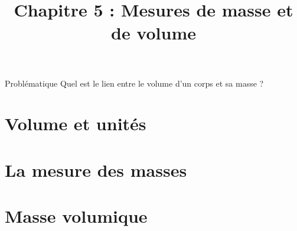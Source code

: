 \documentclass[xcolor={dvipsnames}]{beamer}
\title[Ch 5 : Mesures de masse et de volume]{Chapitre 5 : Mesures de masse et de volume}
\begin{document}
\begin{frame}
  \titlepage 
\end{frame}


\begin{frame}
\begin{block}{Problématique}
	{\Large Quel est le lien entre le volume d'un corps et sa masse ?}
\end{block}
\end{frame}


\section{Volume et unités}




\begin{frame}
	
\end{frame}



\section{La mesure des masses}

\begin{frame}
	
\end{frame}





\section{Masse volumique}

\begin{frame}
	
\end{frame}
\end{document}
